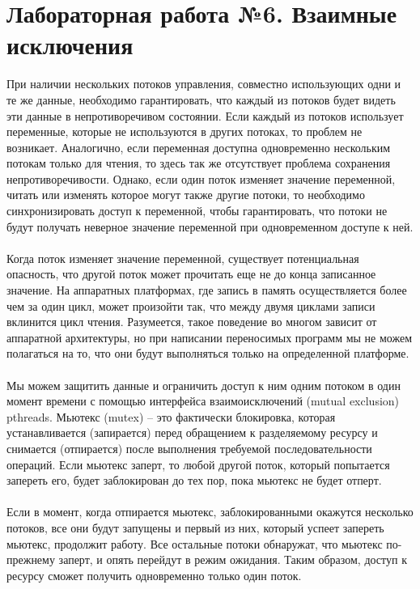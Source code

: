 \documentclass[a4paper]{article}
\begin{document}
\section{\bf Лабораторная работа №6. Взаимные исключения}
При наличии нескольких потоков управления, совместно использующих одни и те же данные, необходимо гарантировать, что каждый из потоков будет видеть эти данные в непротиворечивом состоянии. Если каждый из потоков использует переменные, которые не используются в других потоках, то проблем не возникает. Аналогично, если переменная доступна одновременно нескольким потокам только для чтения, то здесь так же отсутствует проблема сохранения непротиворечивости. Однако, если один поток изменяет значение переменной, читать или изменять которое могут также другие потоки, то необходимо синхронизировать доступ к переменной, чтобы гарантировать, что потоки не будут получать неверное значение переменной при одновременном доступе к ней.\\\\
Когда поток изменяет значение переменной, существует потенциальная опасность, что другой поток может прочитать еще не до конца записанное значение. На аппаратных платформах, где запись в память осуществляется более чем за один цикл, может произойти так, что между двумя циклами записи вклинится цикл чтения. Разумеется, такое поведение во многом зависит от аппаратной архитектуры, но при написании переносимых программ мы не можем полагаться на то, что они будут выполняться только на определенной платформе.\\\\
Мы можем защитить данные и ограничить доступ к ним одним потоком в один момент времени с помощью интерфейса взаимоисключений (mutual exclusion) pthreads. Мьютекс (mutex) – это фактически блокировка, которая устанавливается (запирается) перед обращением к разделяемому ресурсу и снимается (отпирается) после выполнения требуемой последовательности операций. Если мьютекс заперт, то любой другой поток, который попытается запереть его, будет заблокирован до тех пор, пока мьютекс не будет отперт.\\\\
Если в момент, когда отпирается мьютекс, заблокированными окажутся несколько потоков, все они будут запущены и первый из них, который успеет запереть мьютекс, продолжит работу. Все остальные потоки обнаружат, что мьютекс по-прежнему заперт, и опять перейдут в режим ожидания. Таким образом, доступ к ресурсу сможет получить одновременно только один поток.\\\\
\end{document}
